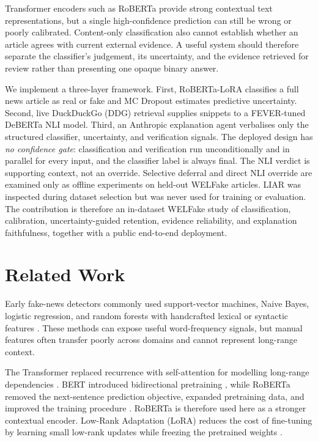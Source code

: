 \documentclass[10pt,twocolumn,letterpaper]{article}
\begin{document}
Transformer encoders such as RoBERTa provide strong contextual text
representations, but a single high-confidence prediction can still be wrong or
poorly calibrated. Content-only classification also cannot establish whether an
article agrees with current external evidence. A useful system should therefore
separate the classifier's judgement, its uncertainty, and the evidence retrieved
for review rather than presenting one opaque binary answer.

We implement a three-layer framework. First, RoBERTa-LoRA classifies a full news
article as real or fake and MC Dropout estimates predictive uncertainty. Second,
live DuckDuckGo (DDG) retrieval supplies snippets to a FEVER-tuned DeBERTa NLI
model. Third, an Anthropic explanation agent verbalises only the structured
classifier, uncertainty, and verification signals. The deployed design has
\emph{no confidence gate}: classification and verification run unconditionally and
in parallel for every input, and the classifier label is always final. The NLI
verdict is supporting context, not an override. Selective deferral and direct NLI
override are examined only as offline experiments on held-out WELFake articles.
LIAR was inspected during dataset selection but was never used for training or
evaluation. The contribution is therefore an in-dataset WELFake study of
classification, calibration, uncertainty-guided retention, evidence reliability,
and explanation faithfulness, together with a public end-to-end deployment.

\section{Related Work}
Early fake-news detectors commonly used support-vector machines, Naive Bayes,
logistic regression, and random forests with handcrafted lexical or syntactic
features \cite{shu2017fake}. These methods can expose useful word-frequency
signals, but manual features often transfer poorly across domains and cannot
represent long-range context.

The Transformer replaced recurrence with self-attention for modelling long-range
dependencies \cite{vaswani2017attention}. BERT introduced bidirectional
pretraining \cite{devlin2019bert}, while RoBERTa removed the next-sentence
prediction objective, expanded pretraining data, and improved the training
procedure \cite{liu2019roberta}. RoBERTa is therefore used here as a stronger
contextual encoder. Low-Rank Adaptation (LoRA) reduces the cost of fine-tuning by
learning small low-rank updates while freezing the pretrained weights
\cite{hu2022lora}.
\end{document}

